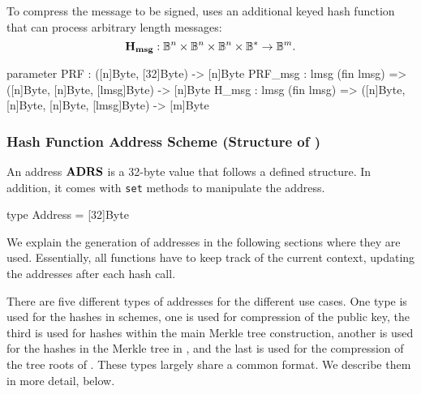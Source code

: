    To compress the message to be signed, \spx uses an additional keyed
   hash function \sphincsHmsg that can process arbitrary length messages:
   \begin{equation*}
     \mathbf{H_{msg}}: \mathbb{B}^n\times\mathbb{B}^n\times\mathbb{B}^n \times \mathbb{B}^{*} \to \mathbb{B}^m.
   \end{equation*}

\begin{code}
  parameter
    PRF : ([n]Byte, [32]Byte) -> [n]Byte
    PRF_msg : {lmsg} (fin lmsg) => ([n]Byte, [n]Byte, [lmsg]Byte) -> [n]Byte
    H_msg : {lmsg} (fin lmsg) =>
      ([n]Byte, [n]Byte, [n]Byte, [lmsg]Byte) -> [m]Byte
\end{code}

\subsubsection{Hash Function Address Scheme (Structure of \adrs)}\label{prelim:addresses}

   An address $\textbf{ADRS}$ is a 32-byte value that follows a defined structure.
   In addition, it comes with \texttt{set} methods to manipulate the address.

\begin{code}
  type Address = [32]Byte
\end{code}

   We explain the generation of addresses in the following sections where they
   are used. Essentially, all functions have to keep track of the current
   context, updating the addresses after each hash call.

   There are five different types of addresses for the different use
   cases.  One type is used for the hashes in \wotsp schemes, one is used
   for compression of the \wotsp public key, the third is used for
   hashes within the main Merkle tree construction, another is used for
   the hashes in the Merkle tree in \fors, and the last is used for the
   compression of the tree roots of \fors. These types largely share a
   common format. We describe them in more detail, below.

